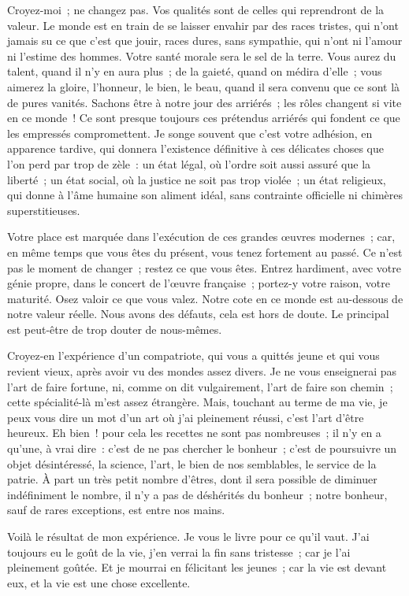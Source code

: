 \documentclass[french,twoside]{book} %
\begin{document}
Croyez-moi ; ne changez pas. Vos qualités sont de celles qui reprendront de la valeur. Le monde est en train de se laisser envahir par des races tristes, qui n’ont jamais su ce que c’est que jouir, races dures, sans sympathie, qui n’ont ni l’amour ni l’estime des hommes. Votre santé morale sera le sel de la terre. Vous aurez du talent, quand il n’y en aura plus ; de la gaieté, quand on médira d’elle ; vous aimerez la gloire, l’honneur, le bien, le beau, quand il sera convenu que ce sont là de pures vanités. Sachons être à notre jour des arriérés ; les rôles changent si vite en ce monde ! Ce sont presque toujours ces prétendus arriérés qui fondent ce que les empressés compromettent. Je songe souvent que c’est votre adhésion, en apparence tardive, qui donnera l’existence définitive à ces délicates choses que l’on perd par trop de zèle : un état légal, où l’ordre soit aussi assuré que la liberté ; un état social, où la justice ne soit pas trop violée ; un état religieux, qui donne à l’âme humaine son aliment idéal, sans contrainte officielle ni chimères superstitieuses.\par
Votre place est marquée dans l’exécution de ces grandes œuvres modernes ; car, en même temps que vous êtes du présent, vous tenez fortement au passé. Ce n’est pas le moment de changer ; restez ce que vous êtes. Entrez hardiment, avec votre génie propre, dans le concert de l’œuvre française ; portez-y votre raison, votre maturité. Osez valoir ce que vous valez. Notre cote en ce monde est au-dessous de notre valeur réelle. Nous avons des défauts, cela est hors de doute. Le principal est peut-être de trop douter de nous-mêmes.\par
Croyez-en l’expérience d’un compatriote, qui vous a quittés jeune et qui vous revient vieux, après avoir vu des mondes assez divers. Je ne vous enseignerai pas l’art de faire fortune, ni, comme on dit vulgairement, l’art de faire son chemin ; cette spécialité-là m’est assez étrangère. Mais, touchant au terme de ma vie, je peux vous dire un mot d’un art où j’ai pleinement réussi, c’est l’art d’être heureux. Eh bien ! pour cela les recettes ne sont pas nombreuses ; il n’y en a qu’une, à vrai dire : c’est de ne pas chercher le bonheur ; c’est de poursuivre un objet désintéressé, la science, l’art, le bien de nos semblables, le service de la patrie. À part un très petit nombre d’êtres, dont il sera possible de diminuer indéfiniment le nombre, il n’y a pas de déshérités du bonheur ; notre bonheur, sauf de rares exceptions, est entre nos mains.\par
Voilà le résultat de mon expérience. Je vous le livre pour ce qu’il vaut. J’ai toujours eu le goût de la vie, j’en verrai la fin sans tristesse ; car je l’ai pleinement goûtée. Et je mourrai en félicitant les jeunes ; car la vie est devant eux, et la vie est une chose excellente.\par
\end{document}
